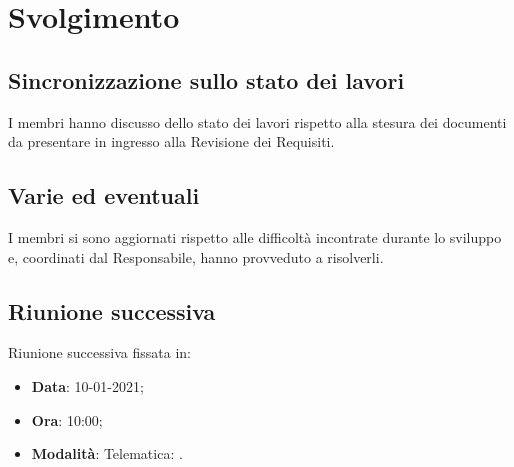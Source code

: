 \documentclass[]{article}
\begin{document}
	\newpage

	\section{Svolgimento}
		\subsection{Sincronizzazione sullo stato dei lavori}
		I membri hanno discusso dello stato dei lavori rispetto alla stesura dei documenti da presentare in ingresso alla Revisione dei Requisiti.\\
		
		\subsection{Varie ed eventuali}
		I membri si sono aggiornati rispetto alle difficoltà incontrate durante lo sviluppo e, coordinati dal Responsabile, hanno provveduto a risolverli.\\
		
		\subsection{Riunione successiva}
		Riunione successiva fissata in:
		\begin{itemize}
			\item \textbf{Data}: 10-01-2021;
			\item \textbf{Ora}: 10:00;
			\item \textbf{Modalità}: Telematica: .
		\end{itemize}
	
\end{document}
